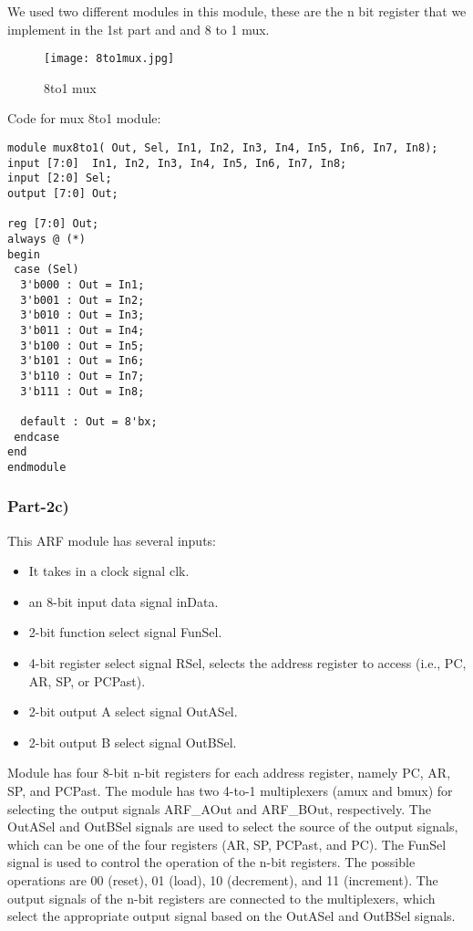 \documentclass[12pt]{article}
\begin{document}
We used two different modules in this module, these are the n bit register that we implement in the 1st part and and 8 to 1 mux.

\begin{figure}[H]
    \centering
    \texttt{[image: 8to1mux.jpg]}
    \caption{8to1 mux}
    \label{fig:8to1mux}
\end{figure}

Code for mux 8to1 module:

\begin{lstlisting}
module mux8to1( Out, Sel, In1, In2, In3, In4, In5, In6, In7, In8); 
input [7:0]  In1, In2, In3, In4, In5, In6, In7, In8; 
input [2:0] Sel;
output [7:0] Out; 

reg [7:0] Out; 
always @ (*) 
begin 
 case (Sel) 
  3'b000 : Out = In1; 
  3'b001 : Out = In2; 
  3'b010 : Out = In3; 
  3'b011 : Out = In4; 
  3'b100 : Out = In5; 
  3'b101 : Out = In6; 
  3'b110 : Out = In7; 
  3'b111 : Out = In8; 

  default : Out = 8'bx; 
 endcase 
end  
endmodule\end{lstlisting}



\clearpage

\subsubsection{Part-2c)}
This ARF module has several inputs: 
\begin{itemize}
    \item It takes in a clock signal clk.
    \item an 8-bit input data signal inData.
    \item 2-bit function select signal FunSel.
    \item 4-bit register select signal RSel, selects the address register to access (i.e., PC, AR, SP, or PCPast). 
    \item 2-bit output A select signal OutASel.
    \item  2-bit output B select signal OutBSel.
\end{itemize}

Module has four 8-bit n-bit registers for each address register, namely PC, AR, SP, and PCPast. The module has two 4-to-1 multiplexers (amux and bmux) for selecting the output signals ARF\_AOut and ARF\_BOut, respectively. The OutASel and OutBSel signals are used to select the source of the output signals, which can be one of the four registers (AR, SP, PCPast, and PC).
The FunSel signal is used to control the operation of the n-bit registers. The possible operations are 00 (reset), 01 (load), 10 (decrement), and 11 (increment). The output signals of the n-bit registers are connected to the multiplexers, which select the appropriate output signal based on the OutASel and OutBSel signals.
\end{document}
